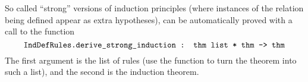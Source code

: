 So called ``strong'' versions of induction principles (where instances
of the relation being defined appear as extra hypotheses), can be
automatically proved with a call to the function 
\[
\ml{IndDefRules.derive\_strong\_induction : thm list * thm -> thm}
\]
The first argument is the list of rules (use the 
function to turn the  theorem into such a list), and
the second is the induction theorem.


